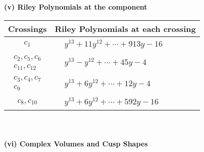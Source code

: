 \documentclass[1p]{elsarticle_modified}
\theoremstyle{definition}
\begin{document}
\newpage\renewcommand{\arraystretch}{1}
\flushleft \textbf{(v) Riley Polynomials at the component}\newline \\
\begin{tabular}{m{50pt}|m{274pt}}
Crossings & \hspace{64pt}Riley Polynomials at each crossing \\
\hline $$\begin{aligned}c_{1}\end{aligned}$$&$\begin{aligned}
&y^{13}+11 y^{12}+\cdots+913 y-16
\end{aligned}$\\
\hline $$\begin{aligned}c_{2},c_{5},c_{6}\\c_{11},c_{12}\end{aligned}$$&$\begin{aligned}
&y^{13}- y^{12}+\cdots+45 y-4
\end{aligned}$\\
\hline $$\begin{aligned}c_{3},c_{4},c_{7}\\c_{9}\end{aligned}$$&$\begin{aligned}
&y^{13}+6 y^{12}+\cdots+12 y-4
\end{aligned}$\\
\hline $$\begin{aligned}c_{8},c_{10}\end{aligned}$$&$\begin{aligned}
&y^{13}+6 y^{12}+\cdots+592 y-16
\end{aligned}$\\
\hline
\end{tabular}\\~\\
\newpage\flushleft \textbf{(vi) Complex Volumes and Cusp Shapes}
\end{document}
